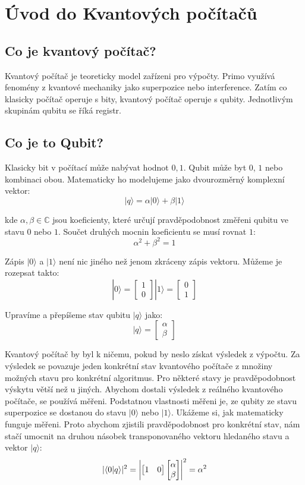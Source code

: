 \documentclass[11pt]{article}
\DeclarePairedDelimiter{\abs}{\lvert}{\rvert}
\begin{document}
\newpage

\section{Úvod do Kvantových počítačů}
\subsection{Co je kvantový počítač?}
Kvantový počítač je teoreticky model zařízeni pro výpočty.
Primo využívá fenomény z kvantové mechaniky jako superpozice nebo interference.
Zatím co klasicky počítač operuje s bity, kvantový počítač operuje s qubity.
Jednotlivým skupinám qubitu se říká registr.

\subsection{Co je to Qubit?}
Klasicky bit v počítací může nabývat hodnot ${0, 1}$.
Qubit může byt $0$, $1$ nebo kombinaci obou.
Matematicky ho modelujeme jako dvourozměrný komplexní vektor:
$$|q\rangle = \alpha|0\rangle + \beta|1\rangle$$
\par kde $\alpha,\beta\in\mathbb{C}$ jsou koeficienty, které určují pravděpodobnost změřeni qubitu ve stavu $0$ nebo $1$.
Součet druhých mocnin koeficientu se musí rovnat $1$:
$$\alpha^2 + \beta^2 = 1$$
\par Zápis $|0\rangle$ a $|1\rangle$ není nic jiného než jenom zkráceny zápis vektoru.
Můžeme je rozepsat takto:
$$|0\rangle = \begin{bmatrix}
        1 \\
        0
    \end{bmatrix} |1\rangle = \begin{bmatrix}
        0 \\
        1
    \end{bmatrix}  $$
\par Upravíme a přepíšeme stav qubitu $|q\rangle$ jako:
$$|q\rangle = \begin{bmatrix}
        \alpha \\
        \beta
    \end{bmatrix}$$

\par Kvantový počítač by byl k ničemu, pokud by neslo získat výsledek z výpočtu.
Za výsledek se povazuje jeden konkrétní stav kvantového počítače z množiny možných stavu pro konkrétní algoritmus.
Pro některé stavy je pravděpodobnost výskytu větší než u jiných.
Abychom dostali výsledek z reálného kvantového počítače, se používá měřeni.
Podstatnou vlastnosti měřeni je, ze qubity ze stavu superpozice se dostanou do stavu $|0\rangle$ nebo $|1\rangle$.
Ukážeme si, jak matematicky funguje měřeni.
Proto abychom zjistili pravděpodobnost pro konkrétní stav, nám stačí umocnit na druhou násobek transponovaného vektoru hledaného stavu a vektor $|q\rangle$:
$$|\langle 0 | q \rangle|^2 = \abs*{\begin{bmatrix}
            1 & 0
        \end{bmatrix}\begin{bmatrix}
            \alpha \\
            \beta
        \end{bmatrix}}^2 = \alpha ^ 2$$
\end{document}
